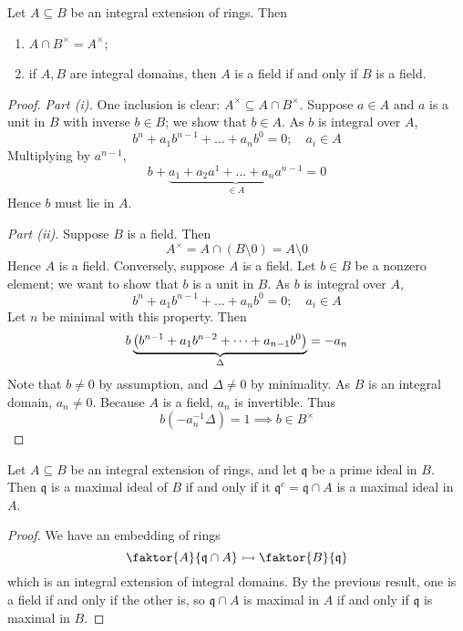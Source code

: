 \begin{lemma}
    Let \( A \subseteq B \) be an integral extension of rings.
    Then
    \begin{enumerate}
        \item \( A \cap B^\times = A^\times \);
        \item if \( A, B \) are integral domains, then \( A \) is a field if and only if \( B \) is a field.
    \end{enumerate}
\end{lemma}
\begin{proof}
    \emph{Part (i).}
    One inclusion is clear: \( A^\times \subseteq A \cap B^\times \).
    Suppose \( a \in A \) and \( a \) is a unit in \( B \) with inverse \( b \in B \); we show that \( b \in A \).
    As \( b \) is integral over \( A \),
    \[ b^n + a_1 b^{n-1} + \dots + a_n b^0 = 0;\quad a_i \in A \]
    Multiplying by \( a^{n-1} \),
    \[ b + \underbrace{a_1 + a_2 a^1 + \dots + a_n a^{n-1}}_{\in A} = 0 \]
    Hence \( b \) must lie in \( A \).

    \emph{Part (ii).}
    Suppose \( B \) is a field.
    Then
    \[ A^\times = A \cap (B \setminus \qty{0}) = A \setminus \qty{0} \]
    Hence \( A \) is a field.
    Conversely, suppose \( A \) is a field.
    Let \( b \in B \) be a nonzero element; we want to show that \( b \) is a unit in \( B \).
    As \( b \) is integral over \( A \),
    \[ b^n + a_1 b^{n-1} + \dots + a_n b^0 = 0;\quad a_i \in A \]
    Let \( n \) be minimal with this property.
    Then
    \[ b\underbrace{\qty(b^{n-1} + a_1 b^{n-2} + \dots + a_{n-1} b^0)}_{\Delta} = -a_n \]
    Note that \( b \neq 0 \) by assumption, and \( \Delta \neq 0 \) by minimality.
    As \( B \) is an integral domain, \( a_n \neq 0 \).
    Because \( A \) is a field, \( a_n \) is invertible.
    Thus
    \[ b(-a_n^{-1} \Delta) = 1 \implies b \in B^\times \]
\end{proof}
\begin{corollary}
    Let \( A \subseteq B \) be an integral extension of rings, and let \( \mathfrak q \) be a prime ideal in \( B \).
    Then \( \mathfrak q \) is a maximal ideal of \( B \) if and only if it \( \mathfrak q^c = \mathfrak q \cap A \) is a maximal ideal in \( A \).
\end{corollary}
\begin{proof}
    We have an embedding of rings
    \[ \faktor{A}{\mathfrak q \cap A} \rightarrowtail \faktor{B}{\mathfrak q} \]
    which is an integral extension of integral domains.
    By the previous result, one is a field if and only if the other is, so \( \mathfrak q \cap A \) is maximal in \( A \) if and only if \( \mathfrak q \) is maximal in \( B \).
\end{proof}
